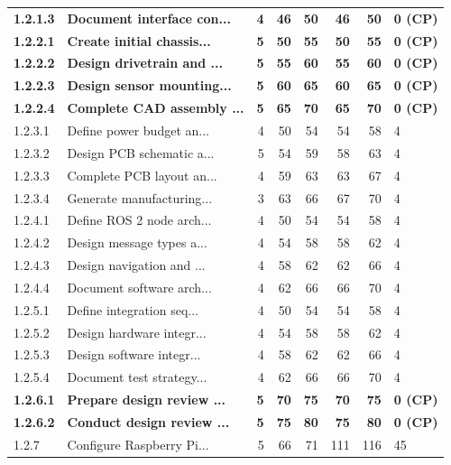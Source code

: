 \begin{longtable}{@{}llrrrrrl@{}}
\textbf{1.2.1.3} & \textbf{Document interface con...} & \textbf{4} & \textbf{46} & \textbf{50} & \textbf{46} & \textbf{50} & \textbf{0 (CP)} \\
\textbf{1.2.2.1} & \textbf{Create initial chassis...} & \textbf{5} & \textbf{50} & \textbf{55} & \textbf{50} & \textbf{55} & \textbf{0 (CP)} \\
\textbf{1.2.2.2} & \textbf{Design drivetrain and ...} & \textbf{5} & \textbf{55} & \textbf{60} & \textbf{55} & \textbf{60} & \textbf{0 (CP)} \\
\textbf{1.2.2.3} & \textbf{Design sensor mounting...} & \textbf{5} & \textbf{60} & \textbf{65} & \textbf{60} & \textbf{65} & \textbf{0 (CP)} \\
\textbf{1.2.2.4} & \textbf{Complete CAD assembly ...} & \textbf{5} & \textbf{65} & \textbf{70} & \textbf{65} & \textbf{70} & \textbf{0 (CP)} \\
1.2.3.1 & Define power budget an... & 4 & 50 & 54 & 54 & 58 & 4 \\
1.2.3.2 & Design PCB schematic a... & 5 & 54 & 59 & 58 & 63 & 4 \\
1.2.3.3 & Complete PCB layout an... & 4 & 59 & 63 & 63 & 67 & 4 \\
1.2.3.4 & Generate manufacturing... & 3 & 63 & 66 & 67 & 70 & 4 \\
1.2.4.1 & Define ROS 2 node arch... & 4 & 50 & 54 & 54 & 58 & 4 \\
1.2.4.2 & Design message types a... & 4 & 54 & 58 & 58 & 62 & 4 \\
1.2.4.3 & Design navigation and ... & 4 & 58 & 62 & 62 & 66 & 4 \\
1.2.4.4 & Document software arch... & 4 & 62 & 66 & 66 & 70 & 4 \\
1.2.5.1 & Define integration seq... & 4 & 50 & 54 & 54 & 58 & 4 \\
1.2.5.2 & Design hardware integr... & 4 & 54 & 58 & 58 & 62 & 4 \\
1.2.5.3 & Design software integr... & 4 & 58 & 62 & 62 & 66 & 4 \\
1.2.5.4 & Document test strategy... & 4 & 62 & 66 & 66 & 70 & 4 \\
\textbf{1.2.6.1} & \textbf{Prepare design review ...} & \textbf{5} & \textbf{70} & \textbf{75} & \textbf{70} & \textbf{75} & \textbf{0 (CP)} \\
\textbf{1.2.6.2} & \textbf{Conduct design review ...} & \textbf{5} & \textbf{75} & \textbf{80} & \textbf{75} & \textbf{80} & \textbf{0 (CP)} \\
1.2.7 & Configure Raspberry Pi... & 5 & 66 & 71 & 111 & 116 & 45 \\

\end{longtable}
